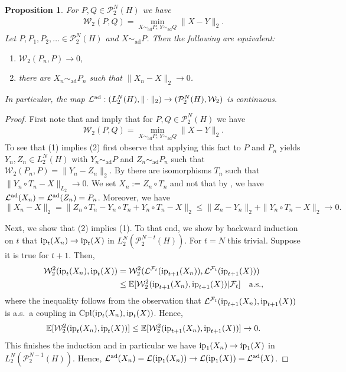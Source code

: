 \documentclass[a4paper]{amsart}
\numberwithin{theorem}{section}
\newtheorem{proposition}[theorem]{Proposition}
\theoremstyle{definition}
\newcommand{\E}{\mathbb{E}}
\newcommand{\F}{\mathcal{F}}
\newcommand{\law}{\mathcal{L}}
\newcommand{\cpl}{\textup{Cpl}}
\newcommand{\W}{\mathcal{W}}
\newcommand{\Pc}{\mathcal P}
\newcommand{\simad}{\sim_{\mathrm{ad}}}
\renewcommand{\H}{H}
\newcommand{\ip}{\textup{ip}}
\newcommand{\lawad}{\law^{\textup{ad}}}
\begin{document}
\begin{proposition}\label{prop:iteratedSkorohod} For $P,Q \in \Pc_2^N(\H)$ we have 
 \begin{align*}\label{eq:W2_min_RV}
     \W_2(P,Q) = \min_{ X \simad P, \, Y \simad Q}    \|X-Y\|_2.
 \end{align*}
Let $P,P_1,P_2,\ldots \in \Pc_2^N(\H)$ and $X \simad P$. Then the following are equivalent: 
\begin{enumerate}
    \item $\W_2(P_n,P) \to 0$,
    \item there are $X_n \simad P_n$ such that $\|X_n -X \|_2 \to 0$.
\end{enumerate}
In particular, the map $\lawad :  (L_2^N(\H),\|\cdot\|_2) \to (\Pc_2^N(\H),\W_2) $ is continuous.
\end{proposition}

\begin{proof}
First note that  and  imply that for $P,Q \in \Pc_2^N(\H)$ we have 
 \begin{align*}%
     \W_2(P,Q) = \min_{ X \simad P,\, Y \simad Q}    \|X-Y\|_2.
 \end{align*}
To see that (1) implies (2) first observe that  
applying this fact to $P$ and $P_n$ yields $Y_n,Z_n \in L_2^N(H)$ with $Y_n \simad P$ and $Z_n \simad P_n$ such that $\W_2(P_n,P) = \| Y_n -Z_n \|_2$.
By  there are isomorphisms $T_n$ such that $\| Y_n \circ T_n - X \|_{L_2} \to 0$. 
We set $X_n := Z_n \circ T_n$ and not that by , we have $\lawad(X_n) = \lawad(Z_n)=P_n$.  Moreover, we have
\[
\| X_n - X \|_2 =  \| Z_n \circ T_n - Y_n \circ T_n +  Y_n \circ T_n - X\|_2  \le \| Z_n - Y_n \|_2 + \| Y_n \circ T_n - X\|_2 \to 0.
\]    

Next, we show that (2) implies (1). To that end, we show by backward induction on $t$ that $\ip_t(X_n)\to \ip_t(X)$ in $L_2^N(\Pc_2^{N-t}(\H))$. For $t=N$ this trivial. Suppose it is true for $t+1$. Then,
\begin{align*}
    \W_2^2(\ip_t(X_n),\ip_t(X)) &= 
    \W_2^2(\law^{\F_t}(\ip_{t+1}(X_n)),\law^{\F_{t}}(\ip_{t + 1}(X))) 
    \\
    &\le \E[\W_2^2(\ip_{t+1}(X_n),\ip_{t+1}(X))|\F_t] \quad \text{a.s.},
\end{align*}
where the inequality follows from the observation that $\law^{\F_t}(\ip_{t+1}(X_n), \ip_{t+1}(X))$ is a.s.\ a coupling in $ \cpl(\ip_t(X_n),\ip_t(X))$.
Hence, 
\[
\E[ \W_2^2(\ip_t(X_n),\ip_t(X)) ] \le \E[\W_2^2(\ip_{t+1}(X_n),\ip_{t+1}(X))] \to 0.
\]
This finishes the induction and in particular we have $\ip_1(X_n) \to \ip_1(X)$ in $L_2^N(\Pc_2^{N-1}(\H))$. Hence, $\lawad(X_n) = \law(\ip_1(X_n)) \to \law(\ip_1(X)) = \lawad(X)$.
\end{proof}
\end{document}
